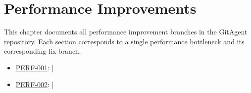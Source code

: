 \chapter{Performance Improvements}
\label{chap:perf-fixes}

This chapter documents all performance improvement branches in the GitAgent repository. Each section corresponds to a single performance bottleneck and its corresponding fix branch.

\begin{itemize}
    \item \hyperref[{sec:perf-001}]{PERF-001}:  | 
    \item \hyperref[{sec:perf-002}]{PERF-002}:  | 
\end{itemize}





